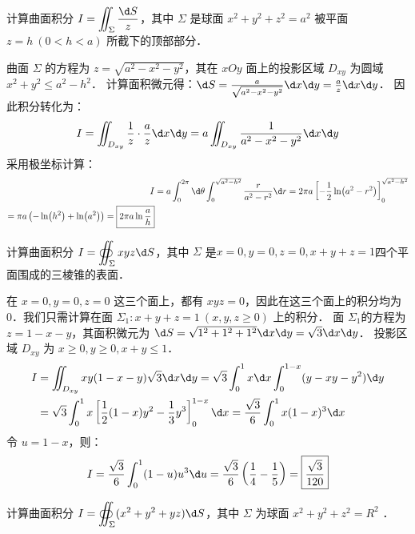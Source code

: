 \documentclass[12pt, a4paper, oneside, UTF8]{ctexbook}
\begin{document}
\begin{example}
    计算曲面积分 $I = \displaystyle\iint_\Sigma \dfrac{\d S}{z} $，其中 $\Sigma$ 是球面 $x^2+y^2+z^2=a^2$ 被平面 $z=h\ (0 < h < a)$ 所截下的顶部部分．
\end{example}
\begin{solution}
    曲面 $\Sigma$ 的方程为 $z = \sqrt{a^2-x^2-y^2}$，其在 $xOy$ 面上的投影区域 $D_{xy}$ 为圆域 $x^2+y^2 \le a^2-h^2$．
    计算面积微元得：$\d S = \frac{a}{\sqrt{a^2-x^2-y^2}} \d x \d y = \frac{a}{z} \d x \d y$．
    因此积分转化为：
    \[ I = \iint_{D_{xy}} \frac{1}{z} \cdot \frac{a}{z} \d x \d y = a \iint_{D_{xy}} \frac{1}{a^2-x^2-y^2} \d x \d y \]
    采用极坐标计算：
    \begin{align*}
        I &= a \int_0^{2\pi} \d\theta \int_0^{\sqrt{a^2-h^2}} \frac{r}{a^2-r^2} \d r = 2\pi a \left[ -\frac{1}{2} \ln(a^2-r^2) \right]_0^{\sqrt{a^2-h^2}} \\
        = \pi a \left( -\ln(h^2) + \ln(a^2) \right) = \boxed{2\pi a \ln\frac{a}{h}}
    \end{align*}
\end{solution}
\begin{example}
    计算曲面积分 $I = \displaystyle\oiint_\Sigma xyz \d S$，其中 $\Sigma$ 是$x=0,y=0,z=0,x+y+z=1$四个平面围成的三棱锥的表面．
\end{example}
\begin{solution}
    在 $x=0, y=0, z=0$ 这三个面上，都有 $xyz=0$，因此在这三个面上的积分均为 0．我们只需计算在面 $\Sigma_1: x+y+z=1\ (x,y,z \ge 0)$ 上的积分．
    面 $\Sigma_1$的方程为 $z = 1-x-y$，其面积微元为 $\d S = \sqrt{1^2+1^2+1^2} \d x \d y = \sqrt{3} \d x \d y$．
    投影区域 $D_{xy}$ 为 $x \ge 0, y \ge 0, x+y \le 1$．
    \begin{align*}
        I &= \iint_{D_{xy}} xy(1-x-y) \sqrt{3} \d x \d y = \sqrt{3} \int_0^1 x \d x \int_0^{1-x} (y-xy-y^2) \d y \\
        &= \sqrt{3} \int_0^1 x \left[ \frac{1}{2}(1-x)y^2 - \frac{1}{3}y^3 \right]_0^{1-x} \d x = \frac{\sqrt{3}}{6} \int_0^1 x(1-x)^3 \d x 
    \end{align*}
    令 $u=1-x$，则：
    \[ I = \frac{\sqrt{3}}{6} \int_0^1 (1-u)u^3 \d u = \frac{\sqrt{3}}{6} \left( \frac{1}{4} - \frac{1}{5} \right) = \boxed{\frac{\sqrt{3}}{120}} \]
\end{solution}
\begin{example}
    计算曲面积分 $I = \displaystyle\oiint_\Sigma (x^2+y^2+yz)\d S$，其中 $\Sigma$ 为球面 $x^2+y^2+z^2=R^2$ ．
\end{example}
\end{document}
